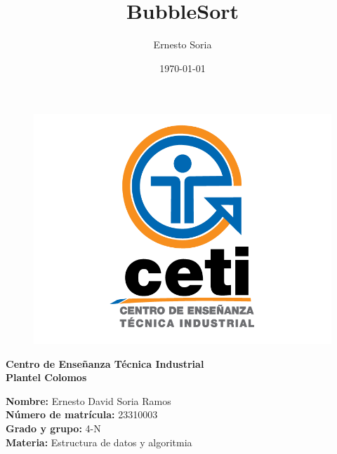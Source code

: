 \documentclass{article}
\title{\Huge \bfseries BubbleSort}
\author{Ernesto Soria}
\date{\today} %
\begin{document}
	
	\maketitle %
	
	
	
	
	\begin{figure}[h] %
		\centering
		\includegraphics[width=1\textwidth]{cetilogo.png} %
		\label{fig:ceti} %
	\end{figure}
	
	\begin{center}
		{\LARGE \textbf{Centro de Enseñanza Técnica Industrial}} \\[2.5mm]
		{\LARGE \textbf{Plantel Colomos}}\\
	\end{center}
	
	\vspace{5mm} %
	
	\begin{flushleft}
		{\large \textbf{Nombre:} Ernesto David Soria Ramos} \\[2mm]
		{\large \textbf{Número de matrícula:} 23310003} \\[2mm]
		{\large \textbf{Grado y grupo:} 4-N}\\[2mm]
		{\large \textbf{Materia:} Estructura de datos y algoritmia }\\[2mm]
	\end{flushleft}
	
\end{document}
